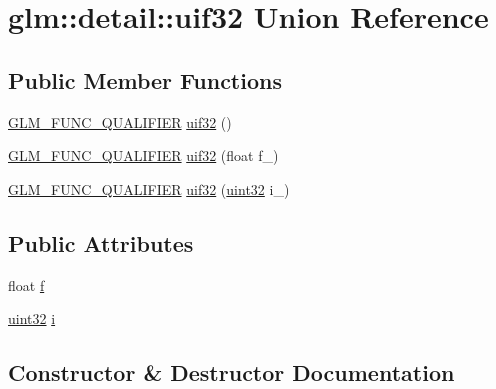 \hypertarget{unionglm_1_1detail_1_1uif32}{}\section{glm\+:\+:detail\+:\+:uif32 Union Reference}
\label{unionglm_1_1detail_1_1uif32}
\subsection*{Public Member Functions}
\begin{DoxyCompactItemize}
\item 
\mbox{\hyperlink{setup_8hpp_a33fdea6f91c5f834105f7415e2a64407}{G\+L\+M\+\_\+\+F\+U\+N\+C\+\_\+\+Q\+U\+A\+L\+I\+F\+I\+ER}} \mbox{\hyperlink{unionglm_1_1detail_1_1uif32_a185c257ac32e21727191ba7e52d97e3e}{uif32}} ()
\item 
\mbox{\hyperlink{setup_8hpp_a33fdea6f91c5f834105f7415e2a64407}{G\+L\+M\+\_\+\+F\+U\+N\+C\+\_\+\+Q\+U\+A\+L\+I\+F\+I\+ER}} \mbox{\hyperlink{unionglm_1_1detail_1_1uif32_a0d6e08c93b3d52c01e45864ff689c426}{uif32}} (float f\+\_\+)
\item 
\mbox{\hyperlink{setup_8hpp_a33fdea6f91c5f834105f7415e2a64407}{G\+L\+M\+\_\+\+F\+U\+N\+C\+\_\+\+Q\+U\+A\+L\+I\+F\+I\+ER}} \mbox{\hyperlink{unionglm_1_1detail_1_1uif32_aee424b46f48baa812572c015ec8bf434}{uif32}} (\mbox{\hyperlink{namespaceglm_1_1detail_ade6cfbf377022aaa391af8cd50489222}{uint32}} i\+\_\+)
\end{DoxyCompactItemize}
\subsection*{Public Attributes}
\begin{DoxyCompactItemize}
\item 
float \mbox{\hyperlink{unionglm_1_1detail_1_1uif32_a5f697f84c5a8ec72c2f3a4f705f5bde8}{f}}
\item 
\mbox{\hyperlink{namespaceglm_1_1detail_ade6cfbf377022aaa391af8cd50489222}{uint32}} \mbox{\hyperlink{unionglm_1_1detail_1_1uif32_a981c1c59e160db23c73908cd7e629229}{i}}
\end{DoxyCompactItemize}


\subsection{Constructor \& Destructor Documentation}
\mbox{\label{unionglm_1_1detail_1_1uif32_a185c257ac32e21727191ba7e52d97e3e}} 
